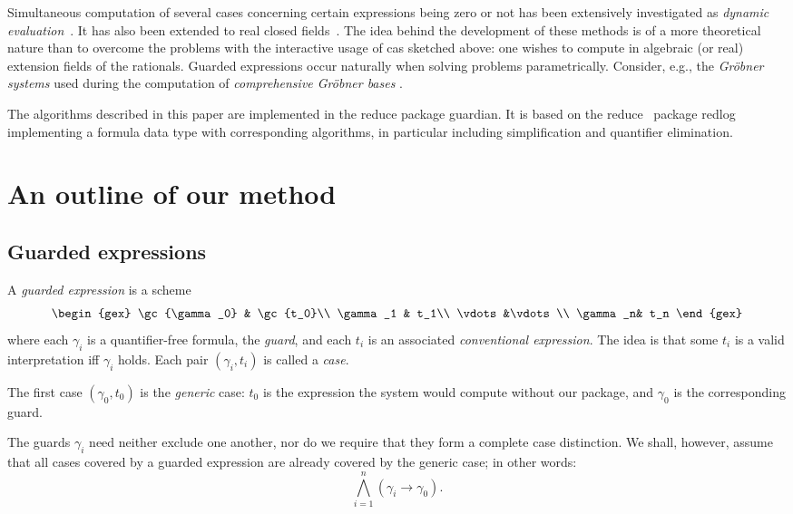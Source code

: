 Simultaneous computation of several cases concerning certain
expressions being zero or not has been extensively investigated as
{\em dynamic
evaluation}~\cite{GomezDiaz:93,DuvalReynaud:94,DuvalReynaud:94a,
BroadberryGomezDiazWatt:95}. It has also been extended to real closed
fields~\cite{DuvalGonzalesVega:93}. The idea behind the development of
these methods is of a more theoretical nature than to overcome the
problems with the interactive usage of {\sc cas} sketched above: one
wishes to compute in algebraic (or real) extension fields of the
rationals. Guarded expressions occur naturally when solving problems
parametrically. Consider, e.g., the {\em Gr\"obner systems} used
during the computation of {\em comprehensive Gr\"obner bases}
\cite{Weispfenning:92}.

The algorithms described in this paper are implemented in the {\sc
reduce} package {\sc guardian}. It is based on the {\sc
reduce}~\cite{HearnFitch:95,Melenk:95} package {\sc
redlog}~\cite{DolzmannSturm:96,DolzmannSturm:96a} implementing a
formula data type with corresponding algorithms, in particular
including simplification and quantifier elimination.

\section{An outline of our method}
\subsection{Guarded expressions}
A {\em guarded expression} is a scheme
$$
\begin{gex}
\gc{\gamma_0} & \gc{t_0}\\
\gamma_1 & t_1\\
\vdots&\vdots\\
\gamma_n& t_n
\end{gex}
$$
where each $\gamma_i$ is a quantifier-free formula, the {\em guard},
and each $t_i$ is an associated {\em conventional expression}. The
idea is that some $t_i$ is a valid interpretation iff $\gamma_i$
holds. Each pair $(\gamma_i,t_i)$ is called a {\em case}.

The first case $(\gamma_0,t_0)$ is the {\em generic} case: $t_0$ is
the expression the system would compute without our package, and
$\gamma_0$ is the corresponding guard.

The guards $\gamma_i$ need neither exclude one another, nor do we
require that they form a complete case distinction. We shall, however,
assume that all cases covered by a guarded expression are already
covered by the generic case; in other words:
\begin{equation}
\bigwedge_{i=1}^n(\gamma_i\longrightarrow\gamma_0).\label{gencoversall}
\end{equation}

